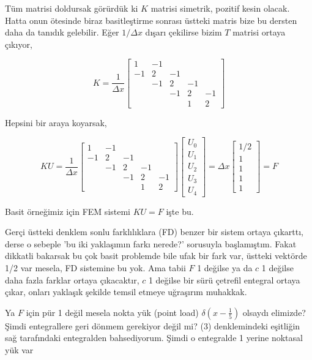 \documentclass[12pt,fleqn]{article}\usepackage{../../common}
\begin{document}
Tüm matrisi doldursak görürdük ki $K$ matrisi simetrik, pozitif kesin olacak.
Hatta onun ötesinde biraz basitleştirme sonrası üstteki matris bize bu dersten
daha da tanıdık gelebilir. Eğer $1/\Delta x$ dışarı çekilirse bizim $T$ matrisi
ortaya çıkıyor,

$$
K = \frac{1}{\Delta x}
\left[\begin{array}{rrrrr}
1 & -1   &    & \\
-1  & 2  & -1 &  &   \\
    & -1 &  2 & -1 &   \\
    &    & -1 & 2 & -1  \\
    &    &    & 1  & 2 
\end{array}\right]
$$

Hepsini bir araya koyarsak,

$$
KU =
\frac{1}{\Delta x}
\left[\begin{array}{rrrrr}
1 & -1   &    & \\
-1  & 2  & -1 &  &   \\
    & -1 &  2 & -1 &   \\
    &    & -1 & 2 & -1  \\
    &    &    & 1  & 2 
\end{array}\right]
\left[\begin{array}{r}
U_0 \\ U_1 \\ U_2 \\ U_3 \\ U_4
\end{array}\right] =
\Delta x
\left[\begin{array}{r}
1/2 \\ 1 \\ 1 \\ 1 \\ 1
\end{array}\right] = F
$$

Basit örneğimiz için FEM sistemi $KU = F$ işte bu.

Gerçi üstteki denklem sonlu farklılıklara (FD) benzer bir sistem ortaya
çıkarttı, derse o sebeple 'bu iki yaklaşımın farkı nerede?' sorusuyla
başlamıştım. Fakat dikkatli bakarsak bu çok basit problemde bile ufak
bir fark var, üstteki vektörde 1/2 var mesela, FD sistemine bu yok.
Ama tabii $F$ 1 değilse ya da $c$ 1 değilse daha fazla farklar ortaya
çıkacaktır, $c$ 1 değilse bir sürü çetrefil entegral ortaya çıkar, onları
yaklaşık şekilde temsil etmeye uğraşırım muhakkak. 

Ya $F$ için pür 1 değil mesela nokta yük (point load) $\delta (x-\frac{1}{5})$
olsaydı elimizde? Şimdi entegrallere geri dönmem gerekiyor değil mi? (3)
denklemindeki eşitliğin sağ tarafındaki entegralden bahsediyorum. Şimdi
o entegralde 1 yerine noktasal yük var
\end{document}
